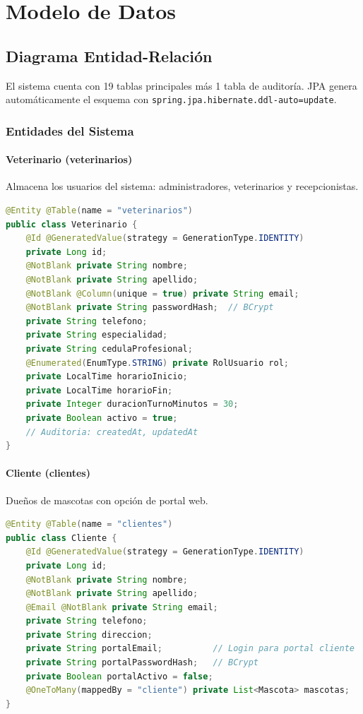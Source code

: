 \chapter{Modelo de Datos}

\section{Diagrama Entidad-Relaci\'on}

El sistema cuenta con 19 tablas principales m\'as 1 tabla de auditor\'ia. JPA genera autom\'aticamente el esquema con \texttt{spring.jpa.hibernate.ddl-auto=update}.

\subsection{Entidades del Sistema}

\subsubsection*{Veterinario (veterinarios)}
Almacena los usuarios del sistema: administradores, veterinarios y recepcionistas.
\begin{lstlisting}[language=Java, caption=Entidad Veterinario]
@Entity @Table(name = "veterinarios")
public class Veterinario {
    @Id @GeneratedValue(strategy = GenerationType.IDENTITY)
    private Long id;
    @NotBlank private String nombre;
    @NotBlank private String apellido;
    @NotBlank @Column(unique = true) private String email;
    @NotBlank private String passwordHash;  // BCrypt
    private String telefono;
    private String especialidad;
    private String cedulaProfesional;
    @Enumerated(EnumType.STRING) private RolUsuario rol;
    private LocalTime horarioInicio;
    private LocalTime horarioFin;
    private Integer duracionTurnoMinutos = 30;
    private Boolean activo = true;
    // Auditoria: createdAt, updatedAt
}
\end{lstlisting}

\subsubsection*{Cliente (clientes)}
Due\~nos de mascotas con opci\'on de portal web.
\begin{lstlisting}[language=Java, caption=Entidad Cliente]
@Entity @Table(name = "clientes")
public class Cliente {
    @Id @GeneratedValue(strategy = GenerationType.IDENTITY)
    private Long id;
    @NotBlank private String nombre;
    @NotBlank private String apellido;
    @Email @NotBlank private String email;
    private String telefono;
    private String direccion;
    private String portalEmail;          // Login para portal cliente
    private String portalPasswordHash;   // BCrypt
    private Boolean portalActivo = false;
    @OneToMany(mappedBy = "cliente") private List<Mascota> mascotas;
}
\end{lstlisting}

